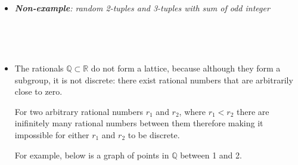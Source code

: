 \documentclass[11pt]{article}
\providecommand{\tightlist}{%
      \setlength{\itemsep}{0pt}\setlength{\parskip}{0pt}}
\def\lt{<}
\begin{document}
    \begin{center}
    \end{center}
    { \hspace*{\fill} \\}
    
    \begin{center}
    \end{center}
    { \hspace*{\fill} \\}
    
    \begin{itemize}
\tightlist
\item
  \emph{\textbf{Non-example}: random 2-tuples and 3-tuples with sum of
  odd integer}
\end{itemize}

    \begin{center}
    \end{center}
    { \hspace*{\fill} \\}
    
    \begin{center}
    \end{center}
    { \hspace*{\fill} \\}
    
    \begin{itemize}
\item
  The rationals \(\mathbb{Q} \subset \mathbb{R}\) do not form a lattice,
  because although they form a subgroup, it is not discrete: there exist
  rational numbers that are arbitrarily close to zero.

  For two arbitrary rational numbers \(r_1\) and \(r_2\), where
  \(r_1 \lt r_2\) there are inifinitely many rational numbers between
  them therefore making it impossible for either \(r_1\) and \(r_2\) to
  be discrete.

  For example, below is a graph of points in \(\mathbb{Q}\) between 1
  and 2.
\end{itemize}

    \begin{center}
    \end{center}
    { \hspace*{\fill} \\}
    
\end{document}
